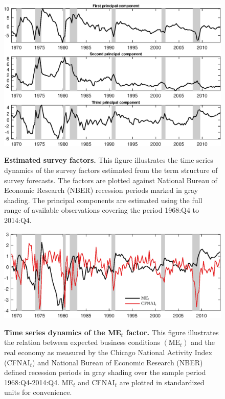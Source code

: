 \documentclass[12pt,letterpaper,leqno,doublespacing]{article}
\begin{document}

\clearpage
\begin{figure}[htbp]
    \caption{
        \textbf{Estimated survey factors.} \newline
        This figure illustrates the time series dynamics of the survey factors estimated from the term structure of survey forecasts. The factors are plotted against National Bureau of Economic Research (NBER) recession periods marked in gray shading. The principal components are estimated using the full range of available observations covering the period 1968:Q4 to 2014:Q4. 
    }
    \centering
    \includegraphics[scale=1]{figures/e_principal_components.eps}
    \label{Fig:e_principal_components}
\end{figure}


\clearpage
\begin{figure}[htbp]
    \caption{
        \textbf{Time series dynamics of the ME$_{t}$ factor.} \newline
        This figure illustrates the relation between expected business conditions $\left(\text{ME}_{t}\right)$ and the real economy as measured by the Chicago National Activity Index (CFNAI$_{t}$) and National Bureau of Economic Research (NBER) defined recession periods in gray shading over the sample period 1968:Q4-2014:Q4. ME$_{t}$ and CFNAI$_{t}$ are plotted in standardized units for convenience. 
    }
    \centering
    \includegraphics[scale=1]{figures/e_me_cfnai.eps}
    \label{Fig:e_me_cfnai}
\end{figure}
\end{document}
